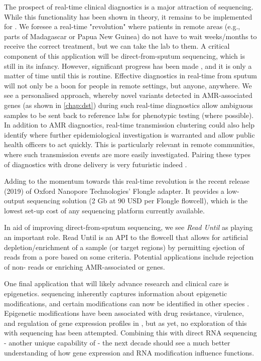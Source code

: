 The prospect of real-time clinical diagnostics is a major attraction of \ont{} sequencing. While this functionality has been shown in theory, it remains to be implemented for \mtb{}. We foresee a real-time "revolution" where patients in remote areas (e.g., parts of Madagascar or Papua New Guinea) do not have to wait weeks/months to receive the correct treatment, but we can take the lab to them. A critical component of this application will be direct-from-sputum \ont{} sequencing, which is still in its infancy. However, significant progress has been made \cite{George2020,Votintseva2017}, and it is only a matter of time until this is routine. Effective diagnostics in real-time from sputum will not only be a boon for people in remote settings, but anyone, anywhere. We see a personalised approach, whereby novel variants detected in AMR-associated genes (as shown in \autoref{chap:dst}) during such real-time diagnostics allow ambiguous samples to be sent back to reference labs for phenotypic testing (where possible). In addition to AMR diagnostics, real-time transmission clustering could also help identify where further epidemiological investigation is warranted and allow public health officers to act quickly. This is particularly relevant in remote communities, where such transmission events are more easily investigated. Pairing these types of diagnostics with drone delivery is very futuristic indeed \cite{Bahrainwala2020}. 

Adding to the momentum towards this real-time revolution is the recent release (2019) of Oxford Nanopore Technologies' Flongle adapter. It provides a low-output sequencing solution (2 Gb at 90 USD per Flongle flowcell), which is the lowest set-up cost of any sequencing platform currently available. 

In aid of improving direct-from-sputum sequencing, we see \emph{Read Until} \cite{Payne2021,Kovaka2021} as playing an important role. Read Until is an API to the flowcell that allows for artificial depletion/enrichment of a sample (or target regions) by permitting ejection of reads from a pore based on some criteria. Potential applications include rejection of non-\mtb{} reads or enriching AMR-associated or \ppe{} genes.

One final application that will likely advance \mtb{} research and clinical care is epigenetics. \ont{} sequencing inherently captures information about epigenetic modifications, and certain modifications can now be identified in other species \cite{Furlan2021}. Epigenetic modifications have been associated with drug resistance, virulence, and regulation of gene expression profiles in \mtb{} \cite{Phelan2018Methylation,Shell2013,Zhu2016Precision}, but as yet, no exploration of this with \ont{} sequencing has been attempted. Combining this with direct RNA sequencing - another unique capability of \ont{} - the next decade should see a much better understanding of how gene expression and RNA modification influence \mtb{} functions.
